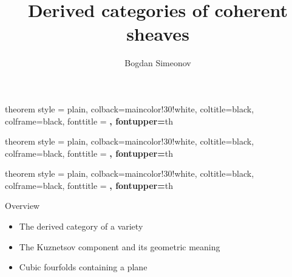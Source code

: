 \documentclass[10pt]{beamer}
\title{Derived categories of coherent sheaves}
\date{}
\author{Bogdan Simeonov}
\begin{document}
 {theorem style = plain, colback=maincolor!30!white, coltitle=black, colframe=black, fonttitle = \upshape\bfseries, fontupper=\itshape}{th}

 {theorem style = plain, colback=maincolor!30!white, coltitle=black, colframe=black, fonttitle = \upshape\bfseries, fontupper=\itshape}{th}

 {theorem style = plain, colback=maincolor!30!white, coltitle=black, colframe=black, fonttitle = \upshape\bfseries, fontupper=\upshape}{th}

\maketitle

\begin{frame}{Overview}
    \begin{itemize}
        \pause
        \item The derived category of a variety \pause
        \item The Kuznetsov component and its geometric meaning \pause
        \item Cubic fourfolds containing a plane 
    \end{itemize}
 
\end{frame}






    
\end{document}
